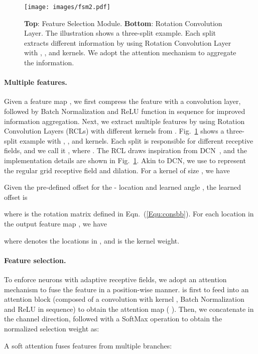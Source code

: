 \documentclass[10pt,twocolumn,letterpaper]{article}
\begin{document}
\begin{figure}\centering
\texttt{[image: images/fsm2.pdf]}
\caption{\textbf{Top}: Feature Selection Module. \textbf{Bottom}: Rotation Convolution Layer. The illustration shows a three-split example.
Each split extracts different information by using Rotation Convolution Layer with , , and  kernels.
We adopt the attention mechanism to aggregate the information.
}
\label{fig:fsm}
\end{figure}
 
\paragraph{Multiple features.}
Given a feature map   , we first compress the feature with a  convolution layer, followed by Batch Normalization\cite{ioffe2015batch} and ReLU\cite{nair2010rectified} function in sequence for improved information aggregation.
Next, we extract multiple features by using Rotation Convolution Layers (RCLs) with different kernels from   . Fig.~\ref{fig:fsm} shows a three-split example with , , and  kernels. Each split is responsible for different receptive fields, and we call it   , where   . The RCL draws inspiration from DCN~\cite{dai2017deformable}, and the implementation details are shown in Fig.~\ref{fig:fsm}.
Akin to DCN, we use  to represent the regular grid receptive field and dilation. For a kernel of size , we have

Given the pre-defined offset    for the - location and learned angle , the learned offset is

where  is the rotation matrix defined in Eqn.~(\ref{Equ:consbb}).
For each location  in the output feature map , we have

where  denotes the locations in , and  is the kernel weight.

\paragraph{Feature selection.}
To enforce neurons with adaptive receptive fields, we adopt an attention mechanism to fuse the feature in a position-wise manner.  is first to feed into an attention block (composed of a convolution with kernel , Batch Normalization and ReLU in sequence) to obtain the attention map    (  ).
Then, we concatenate  in the channel direction, followed with a SoftMax operation to obtain the normalized selection weight  as:

A soft attention fuses features from multiple branches:
\end{document}
